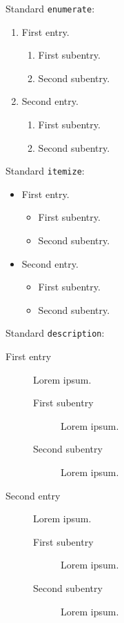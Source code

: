 \noindent
Standard \texttt{enumerate}:
\begin{enumerate}
	\item
		First entry.
		\begin{enumerate}
			\item
				First subentry.
			\item
				Second subentry.
		\end{enumerate}
	\item
		Second entry.
		\begin{enumerate}
			\item
				First subentry.
			\item
				Second subentry.
		\end{enumerate}
\end{enumerate}
Standard \texttt{itemize}:
\begin{itemize}
	\item
		First entry.
		\begin{itemize}
			\item
				First subentry.
			\item
				Second subentry.
			\end{itemize}
	\item
		Second entry.
		\begin{itemize}
			\item
				First subentry.
			\item
				Second subentry.
		\end{itemize}
\end{itemize}
Standard \texttt{description}:
\begin{description}
	\item[First entry]
		Lorem ipsum.
		\begin{description}
			\item[First subentry]
				Lorem ipsum.
			\item[Second subentry]
				Lorem ipsum.
		\end{description}
	\item[Second entry]
		Lorem ipsum.
		\begin{description}
			\item[First subentry]
				Lorem ipsum.
			\item[Second subentry]
				Lorem ipsum.
		\end{description}
\end{description}

